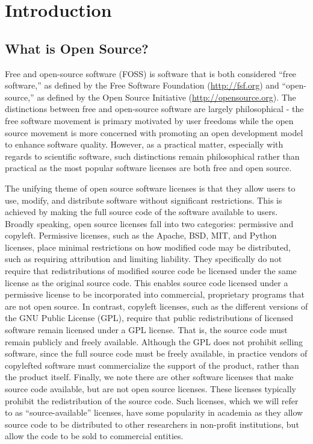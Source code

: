 \section{Introduction}

\subsection*{What is Open Source?}

Free and open-source software (FOSS) is software that is both considered ``free software,'' as defined by the Free Software Foundation (\url{http://fsf.org}) and ``open-source,'' as defined by the Open Source Initiative (\url{http://opensource.org}).  The distinctions between free and open-source software are largely philosophical  - the free software movement is primary motivated by user freedoms while the open source movement is more concerned with promoting an open development model to enhance software quality.  However, as a practical matter, especially with regards to scientific software, such distinctions remain philosophical rather than practical as the most popular software licenses are both free and open source.  

The unifying theme of open source software licenses is that they allow users to use, modify, and distribute software without significant restrictions.  This is achieved by making the full source code of the software available to users.  Broadly speaking, open source licenses fall into two categories: permissive and copyleft. Permissive licenses, such as the Apache, BSD, MIT, and Python licenses, place minimal restrictions on how modified code may be distributed, such as requiring attribution and limiting liability.  They specifically do not require that redistributions of modified source code be licensed under the same license as the original source code.  This enables source code licensed under a permissive license to be incorporated into commercial, proprietary programs that are not open source.  In contrast, copyleft licenses, such as the different versions of the GNU Public License (GPL), require that public redistributions of licensed software remain licensed under a GPL license.  That is, the source code must remain publicly and freely available. Although the GPL does not prohibit selling software, since the full source code must be freely available, in practice vendors of copylefted software must commercialize the support of the product, rather than the product itself. Finally, we note there are other software licenses that make source code available, but are not open source licenses.  These licenses typically prohibit the redistribution of the source code.  Such licenses, which we will refer to as ``source-available'' licenses, have some popularity in academia as they allow source code to be distributed to other researchers in non-profit institutions, but allow the code to be sold to commercial entities.


